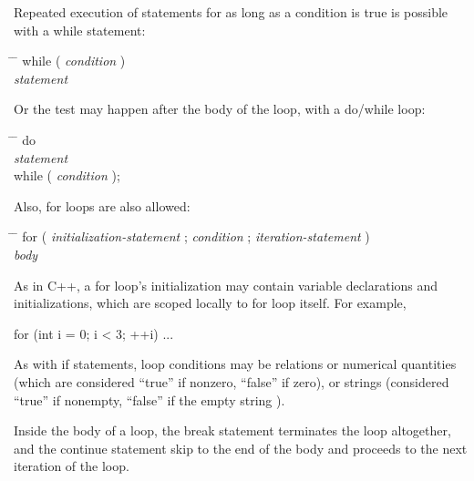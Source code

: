 \documentclass[11pt,letterpaper]{book}
\begin{document}
Repeated execution of statements for as long as a condition is true is
possible with a {\cf while} statement:

\begin{tabbing}
\hspace{0.5in} \= \hspace{0.3in} \= \kill
\> {\cf while (} \emph{condition} {\cf )} \\
\> \> \emph{statement}  
\end{tabbing}

Or the test may happen after the body of the loop, with a {\cf do/while}
loop:

\begin{tabbing}
\hspace{0.5in} \= \hspace{0.3in} \= \kill
\> {\cf do } \\
\> \> \emph{statement}  \\
\> {\cf while (} \emph{condition} {\cf );} \\
\end{tabbing}

\noindent Also, {\cf for} loops are also allowed:

\begin{tabbing}
\hspace{0.5in} \= \hspace{0.3in} \= \kill
\> {\cf for (} \emph{initialization-statement} {\cf ;} \emph{condition} {\cf ;} \emph{iteration-statement} {\cf )} \\
\> \> \emph{body}  
\end{tabbing}

As in C++, a {\cf for} loop's initialization may contain variable
declarations and initializations, which are scoped locally to {\cf for}
loop itself.  For example,

\begin{code}
      for (int i = 0;  i < 3;  ++i) {
          ...
      }
\end{code}

As with {\cf if} statements, loop conditions may be relations or
numerical quantities (which are considered ``true'' if nonzero, 
``false'' if zero), or strings (considered ``true'' if nonempty,
``false'' if the empty string \qkw{}).

Inside the body of a loop, the {\cf break} statement terminates the loop
altogether, and the {\cf continue} statement skip to the end of the body
and proceeds to the next iteration of the loop.
\end{document}
